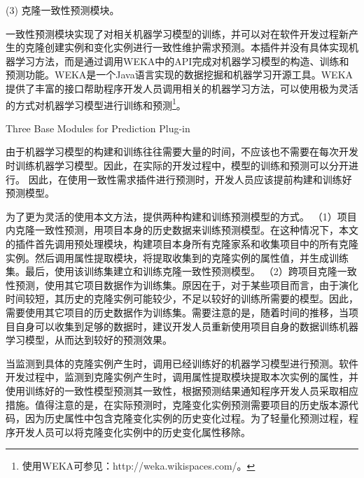 (3) 克隆一致性预测模块。

一致性预测模块实现了对相关机器学习模型的训练，并可以对在软件开发过程新产生的克隆创建实例和变化实例进行一致性维护需求预测。本插件并没有具体实现机器学习方法，而是通过调用WEKA中的API完成对机器学习模型的构造、训练和预测功能。WEKA是一个Java语言实现的数据挖掘和机器学习开源工具。WEKA提供了丰富的接口帮助程序开发人员调用相关的机器学习方法，可以使用极为灵活的方式对机器学习模型进行训练和预测\footnote{使用WEKA可参见：http://weka.wikispaces.com/。}。





{Three Base Modules for Prediction Plug-in }

由于机器学习模型的构建和训练往往需要大量的时间，不应该也不需要在每次开发时训练机器学习模型。因此，在实际的开发过程中，模型的训练和预测可以分开进行。
因此，在使用一致性需求插件进行预测时，开发人员应该提前构建和训练好预测模型。

为了更为灵活的使用本文方法，提供两种构建和训练预测模型的方式。
（1）项目内克隆一致性预测，用项目本身的历史数据来训练预测模型。在这种情况下，本文的插件首先调用预处理模块，构建项目本身所有克隆家系和收集项目中的所有克隆实例。然后调用属性提取模块，将提取收集到的克隆实例的属性值，并生成训练集。最后，使用该训练集建立和训练克隆一致性预测模型。
（2）跨项目克隆一致性预测，使用其它项目数据作为训练集。原因在于，对于某些项目而言，由于演化时间较短，其历史的克隆实例可能较少，不足以较好的训练所需要的模型。因此，需要使用其它项目的历史数据作为训练集。需要注意的是，随着时间的推移，当项目自身可以收集到足够的数据时，建议开发人员重新使用项目自身的数据训练机器学习模型，从而达到较好的预测效果。

当监测到具体的克隆实例产生时，调用已经训练好的机器学习模型进行预测。软件开发过程中，监测到克隆实例产生时，调用属性提取模块提取本次实例的属性，并使用训练好的一致性模型预测其一致性，根据预测结果通知程序开发人员采取相应措施。值得注意的是，在实际预测时，克隆变化实例预测需要项目的历史版本源代码，因为历史属性中包含克隆变化实例的历史变化过程。为了轻量化预测过程，程序开发人员可以将克隆变化实例中的历史变化属性移除。

